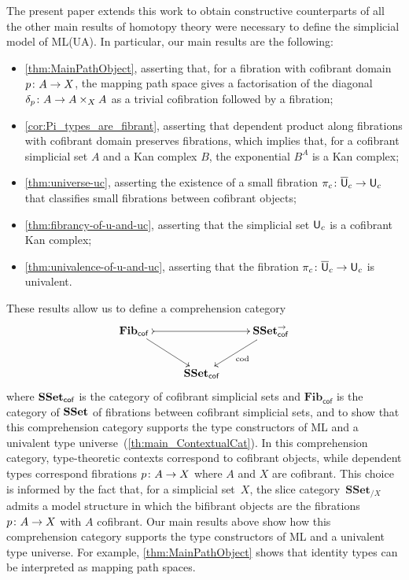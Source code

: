 \documentclass[reqno,10pt,a4paper,oneside,draft]{amsart}
\begin{document}
 The present paper extends this work to obtain constructive counterparts of all the other main results of 
homotopy theory were necessary to define the simplicial model of ML(UA). In particular, our main results are the following:
\begin{itemize}
\item \cref{thm:MainPathObject}, asserting that, for a fibration with cofibrant domain $p \colon A \to X$, the mapping path space 
gives a factorisation of the diagonal $\delta_p \colon A \to A \times_X A$ as a trivial cofibration followed by a fibration;
\item \cref{cor:Pi_types_are_fibrant}, asserting that dependent product along fibrations with cofibrant
domain preserves fibrations, which implies that, for a cofibrant simplicial set $A$ and a Kan complex $B$, the exponential $B^A$ is a Kan complex; 
\item \cref{thm:universe-uc}, asserting the existence of a small fibration $\pi_c \colon
\overline{\mathsf{U}}_c \to \mathsf{U}_c$ that classifies small fibrations between cofibrant objects;
\item \cref{thm:fibrancy-of-u-and-uc}, asserting that the simplicial set $\mathsf{U}_c$ is a cofibrant Kan complex;
\item \cref{thm:univalence-of-u-and-uc}, asserting that the fibration $\pi_c  \colon
\overline{\mathsf{U}}_c \to \mathsf{U}_c$ is univalent.
\end{itemize}



These results allow us to define a comprehension category 
\begin{equation*}
\begin{gathered}
\xymatrix{
\mathbf{Fib}_{ \mathsf{cof}} \, \ar[dr] \ar@{>->}[rr] & & \SSet^{\to}_{\mathsf{cof}} \ar[dl]^{\mathrm{cod}} \\ 
 & \SSet_{\mathsf{cof}} &  }
 \end{gathered}
 \end{equation*}
 where $\mathbf{SSet}_{\mathsf{cof}}$ is the category of cofibrant simplicial sets and  $\mathbf{Fib}_{ \mathsf{cof}}$ is the category of $\mathbf{SSet}$ of fibrations between cofibrant simplicial
 sets, and to show that this comprehension category supports the type constructors of ML and a univalent type universe~(\cref{th:main_ContextualCat}). In this 
comprehension category, type-theoretic
contexts correspond to cofibrant objects, while dependent types correspond fibrations $p \colon A \to X$ where 
 $A$ and $X$ are cofibrant. This choice is informed by the fact that, for a simplicial set~$X$, the slice category~$\mathbf{SSet}_{/X}$ admits a model structure in which the bifibrant objects are
 the fibrations $p \colon A \to X$ with $A$ cofibrant. Our main results above show how this comprehension category  supports the type constructors of ML and a univalent type universe.
For example, \cref{thm:MainPathObject} shows that identity types can be interpreted as 
mapping path spaces. 
\end{document}
